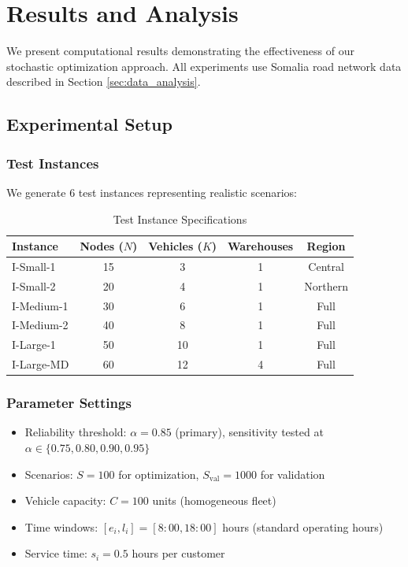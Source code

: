 \section{Results and Analysis}
\label{sec:results}

We present computational results demonstrating the effectiveness of our stochastic optimization approach. All experiments use Somalia road network data described in Section \ref{sec:data_analysis}.

\subsection{Experimental Setup}

\subsubsection{Test Instances}

We generate 6 test instances representing realistic scenarios:

\begin{table}[H]
\centering
\caption{Test Instance Specifications}
\begin{tabular}{lcccc}
\toprule
Instance & Nodes ($N$) & Vehicles ($K$) & Warehouses & Region \\
\midrule
I-Small-1 & 15 & 3 & 1 & Central \\
I-Small-2 & 20 & 4 & 1 & Northern \\
I-Medium-1 & 30 & 6 & 1 & Full \\
I-Medium-2 & 40 & 8 & 1 & Full \\
I-Large-1 & 50 & 10 & 1 & Full \\
I-Large-MD & 60 & 12 & 4 & Full \\
\bottomrule
\end{tabular}
\end{table}

\subsubsection{Parameter Settings}

\begin{itemize}
\item Reliability threshold: $\alpha = 0.85$ (primary), sensitivity tested at $\alpha \in \{0.75, 0.80, 0.90, 0.95\}$
\item Scenarios: $S = 100$ for optimization, $S_{\text{val}} = 1000$ for validation
\item Vehicle capacity: $C = 100$ units (homogeneous fleet)
\item Time windows: $[e_i, l_i] = [8:00, 18:00]$ hours (standard operating hours)
\item Service time: $s_i = 0.5$ hours per customer
\end{itemize}


